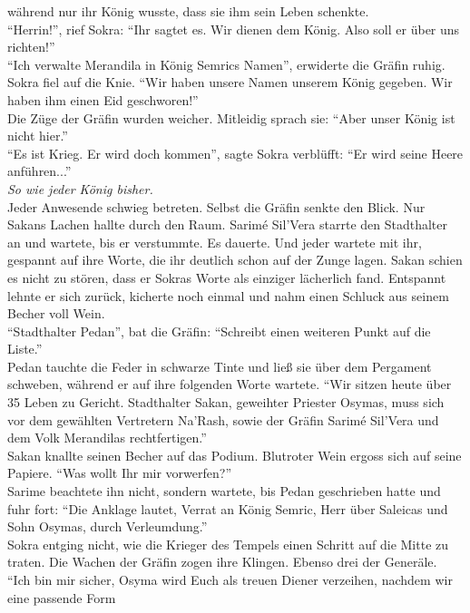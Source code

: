 während nur ihr König wusste, dass sie ihm sein Leben schenkte.\\
``Herrin!'', rief Sokra: ``Ihr sagtet es. Wir dienen dem König. Also soll er über uns richten!''\\
``Ich verwalte Merandila in König Semrics Namen'', erwiderte die Gräfin ruhig.\\
Sokra fiel auf die Knie. ``Wir haben unsere Namen unserem König gegeben. Wir haben ihm einen Eid 
geschworen!''\\
Die Züge der Gräfin wurden weicher. Mitleidig sprach sie: ``Aber unser König ist nicht hier.''\\
``Es ist Krieg. Er wird doch kommen'', sagte Sokra verblüfft: ``Er wird seine Heere anführen...''\\
\textit{So wie jeder König bisher.}\\
Jeder Anwesende schwieg betreten. Selbst die Gräfin senkte den Blick. Nur Sakans Lachen hallte 
durch den Raum. Sarimé Sil'Vera starrte den Stadthalter an und wartete, bis er verstummte. Es 
dauerte. Und jeder wartete mit ihr, gespannt auf ihre Worte, die ihr deutlich schon auf der Zunge 
lagen. Sakan schien es nicht zu stören, dass er Sokras Worte als einziger lächerlich fand. 
Entspannt lehnte er sich zurück, kicherte noch einmal und nahm einen Schluck aus seinem Becher voll 
Wein.\\
``Stadthalter Pedan'', bat die Gräfin: ``Schreibt einen weiteren Punkt auf die Liste.''\\
Pedan tauchte die Feder in schwarze Tinte und ließ sie über dem Pergament schweben, während er auf 
ihre folgenden Worte wartete. ``Wir sitzen heute über 35 Leben zu Gericht. Stadthalter Sakan, 
geweihter Priester Osymas, muss sich vor dem gewählten Vertretern Na'Rash, sowie der Gräfin Sarimé 
Sil'Vera und dem Volk Merandilas rechtfertigen.''\\
Sakan knallte seinen Becher auf das Podium. Blutroter Wein ergoss sich auf seine Papiere. ``Was 
wollt Ihr mir vorwerfen?''\\
Sarime beachtete ihn nicht, sondern wartete, bis Pedan geschrieben hatte und fuhr fort: ``Die 
Anklage lautet, Verrat an König Semric, Herr über Saleicas und Sohn Osymas, durch Verleumdung.''\\
Sokra entging nicht, wie die Krieger des Tempels einen Schritt auf die Mitte zu traten. Die Wachen 
der Gräfin zogen ihre Klingen. Ebenso drei der Generäle.\\
``Ich bin mir sicher, Osyma wird Euch als treuen Diener verzeihen, nachdem wir eine passende Form 
